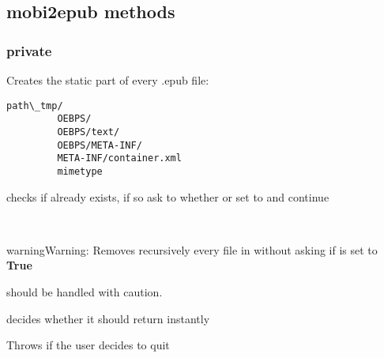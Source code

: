 \documentclass[letterpaper,10pt,english]{sphinxmanual}
\begin{document}
\subsection{mobi2epub methods}
\label{epub:mobi2epub-methods}

\subsubsection{private}
\label{epub:id1}

\begin{fulllineitems}
\label{epub:mobi2epub::directory_structureC}
Creates the static part of every .epub file:

\begin{Verbatim}[commandchars=\\\{\}]
path\_tmp/
         OEBPS/
         OEBPS/text/
         OEBPS/META-INF/
         META-INF/container.xml
         mimetype
\end{Verbatim}

checks if already exists, if so ask to whether {\hyperref[epub:mobi2epub::cleanupC]{}}
or set to {\hyperref[epub:safe__mutable-b]{}} and continue

\end{fulllineitems}


\begin{fulllineitems}
\label{epub:mobi2epub::cleanupC}~
\begin{notice}{warning}{Warning:}
Removes recursively every file in {\hyperref[epub:path_tmp__boost::filesystem::path]{}} without asking if {\hyperref[epub:safe__mutable-b]{}} is set to \textbf{True}

should be handled with caution.
\end{notice}

{\hyperref[epub:no_cleanup__mutable-b]{}} decides whether it should return instantly

Throws {\hyperref[exceptions:epub::user_wants_out_exception]{}} if the user decides to quit

\end{fulllineitems}
\end{document}
